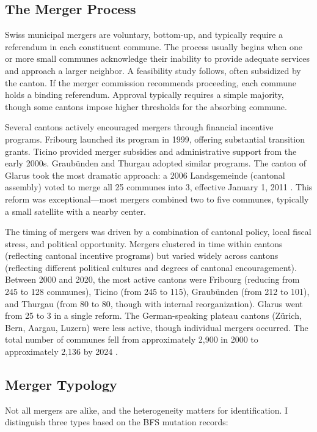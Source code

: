 \documentclass[12pt]{article}
\begin{document}
\subsection{The Merger Process}

Swiss municipal mergers are voluntary, bottom-up, and typically require a referendum in each constituent commune. The process usually begins when one or more small communes acknowledge their inability to provide adequate services and approach a larger neighbor. A feasibility study follows, often subsidized by the canton. If the merger commission recommends proceeding, each commune holds a binding referendum. Approval typically requires a simple majority, though some cantons impose higher thresholds for the absorbing commune.

Several cantons actively encouraged mergers through financial incentive programs. Fribourg launched its program in 1999, offering substantial transition grants. Ticino provided merger subsidies and administrative support from the early 2000s. Graub\"{u}nden and Thurgau adopted similar programs. The canton of Glarus took the most dramatic approach: a 2006 Landsgemeinde (cantonal assembly) voted to merge all 25 communes into 3, effective January 1, 2011 \citep{koch2017swiss}. This reform was exceptional---most mergers combined two to five communes, typically a small satellite with a nearby center.

The timing of mergers was driven by a combination of cantonal policy, local fiscal stress, and political opportunity. Mergers clustered in time within cantons (reflecting cantonal incentive programs) but varied widely across cantons (reflecting different political cultures and degrees of cantonal encouragement). Between 2000 and 2020, the most active cantons were Fribourg (reducing from 245 to 128 communes), Ticino (from 245 to 115), Graub\"{u}nden (from 212 to 101), and Thurgau (from 80 to 80, though with internal reorganization). Glarus went from 25 to 3 in a single reform. The German-speaking plateau cantons (Z\"{u}rich, Bern, Aargau, Luzern) were less active, though individual mergers occurred. The total number of communes fell from approximately 2,900 in 2000 to approximately 2,136 by 2024 \citep{steiner2012assessing}.

\subsection{Merger Typology}

Not all mergers are alike, and the heterogeneity matters for identification. I distinguish three types based on the BFS mutation records:
\end{document}
